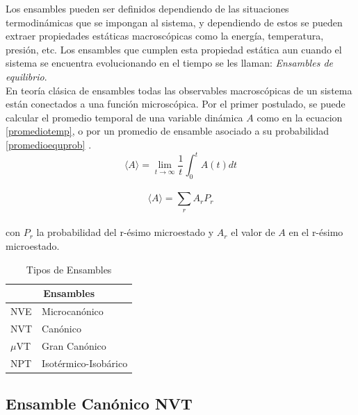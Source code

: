 Los ensambles pueden ser definidos dependiendo de las situaciones termodinámicas que se impongan al sistema, y dependiendo de estos se pueden extraer propiedades estáticas macroscópicas como la energía, temperatura, presión, etc. Los ensambles que cumplen esta propiedad estática aun cuando el sistema se encuentra evolucionando en el tiempo se les llaman: \textit{Ensambles de equilibrio}.\\

En teoría clásica de ensambles todas las observables macroscópicas de un sistema están conectados a una función microscópica. Por el primer postulado, se puede calcular el promedio temporal de una variable dinámica $A$ como en la ecuacion \ref{promediotemp}, o por un promedio de ensamble asociado a su probabilidad \ref{promedioequprob} \cite{tuckerman2010}. \\

\begin{equation} \label{promediotemp}
    \langle A\rangle = \lim_{t\to\infty}\frac{1}{t}\int_0^t A(t)dt
\end{equation}\\

\begin{equation} \label{promedioequprob}
    \langle A\rangle =\sum_r A_r P_r
\end{equation}\\

con $P_r$ la probabilidad del r-ésimo microestado y $A_r$ el valor de $A$ en el r-ésimo microestado.\\

\begin{table}[h!]
    \centering
    \begin{tabular}{ |p{1cm}||p{4cm}|  }
    \hline
    \multicolumn{2}{|c|}{Ensambles} \\
    \hline
    NVE   & Microcanónico \\
    NVT   & Canónico \\
    $\mu$VT& Gran Canónico \\
    NPT   & Isotérmico-Isobárico \\
    \hline
    \end{tabular}
    \caption{Tipos de Ensambles}
    \label{tiposEnsamble}
\end{table}

\subsection{Ensamble Canónico NVT}


